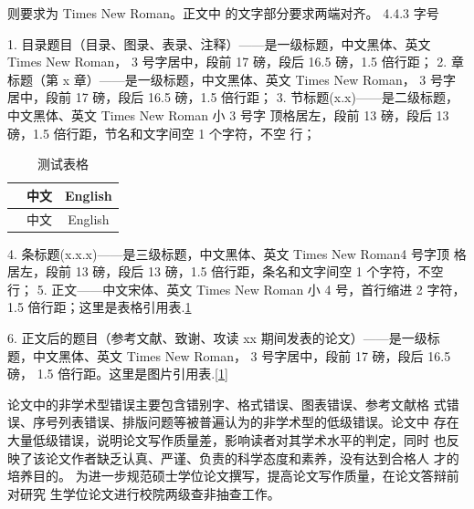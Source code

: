 \documentclass{CQUPTThesis}
\begin{document}
则要求为 Times New Roman。正文中
的文字部分要求两端对齐。
4.4.3 字号

1. 目录题目（目录、图录、表录、注释）——是一级标题，中文黑体、英文
Times New Roman， 3 号字居中，段前 17 磅，段后 16.5 磅，1.5 倍行距；
2. 章标题（第 x 章）——是一级标题，中文黑体、英文 Times New Roman， 3
号字居中，段前 17 磅，段后 16.5 磅，1.5 倍行距；
3. 节标题(x.x)——是二级标题，中文黑体、英文 Times New Roman 小 3 号字
顶格居左，段前 13 磅，段后 13 磅，1.5 倍行距，节名和文字间空 1 个字符，不空
行；
\begin{table}[h]
\centering
\caption{测试表格}
\begin{tabular}{|c|c|c|}
\hline
 &中文&English\\\hline
 &中文&English \\\hline
\end{tabular}
\label{table}
\end{table}

4. 条标题(x.x.x)——是三级标题，中文黑体、英文 Times New Roman4 号字顶
格居左，段前 13 磅，段后 13 磅，1.5 倍行距，条名和文字间空 1 个字符，不空行；
5. 正文——中文宋体、英文 Times New Roman 小 4 号，首行缩进 2 字符，1.5
倍行距；这里是表格引用表.\ref{table}

6. 正文后的题目（参考文献、致谢、攻读 xx 期间发表的论文）——是一级标
题，中文黑体、英文 Times New Roman， 3 号字居中，段前 17 磅，段后 16.5 磅，
1.5 倍行距。这里是图片引用表.\ref{1}

论文中的非学术型错误主要包含错别字、格式错误、图表错误、参考文献格
式错误、序号列表错误、排版问题等被普遍认为的非学术型的低级错误。论文中
存在大量低级错误，说明论文写作质量差，影响读者对其学术水平的判定，同时
也反映了该论文作者缺乏认真、严谨、负责的科学态度和素养，没有达到合格人
才的培养目的。
为进一步规范硕士学位论文撰写，提高论文写作质量，在论文答辩前对研究
生学位论文进行校院两级查非抽查工作。
\end{document}

